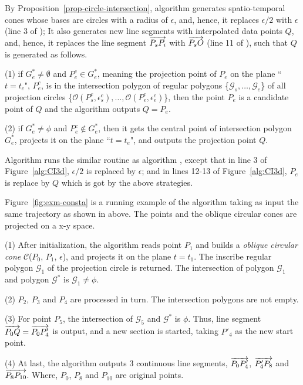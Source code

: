 By Proposition~\ref{prop-circle-intersection}, algorithm \cista generates spatio-temporal cones whose bases are circles with a radius of $\epsilon$,
and, hence, it replaces $\epsilon/2$ with $\epsilon$ (line 3 of \cist);
It also generates new line segments with interpolated data points $Q$, and, hence,  it replaces the line segment $\protect\overrightarrow{P_sP_i}$ with $\protect\overrightarrow{P_sO}$ (line 11 of \cist),
such that $Q$ is generated as follows.


\sstab (1) if $G^*_e \ne \emptyset$ and $P^c_e \in G^*_e$, meaning the projection point of $P_e$ on the plane ``$t=t_c$", \ie $P^c_e$, is in the intersection polygon of regular polygons \{$\mathcal{G}_s, \dots, \mathcal{G}_e$\} of all projection circles \{$\mathcal{O}(P^c_s, \epsilon^c_s), \ldots, \mathcal{O}(P^c_e, \epsilon^c_e)$\}, then the point $P_e$ is a candidate point of $Q$ and the algorithm outputs $Q=P_e$.

\sstab (2) if $G^*_e \ne \phi$ and $P^c_e \notin G^*_e$, then it gets the central point of intersection polygon $G^*_e$, projects it on the plane ``$t=t_e$", and outputs the projection point $Q$.

\vspace{1ex}
Algorithm \cista runs the similar routine as algorithm \cist, except that in line 3 of Figure~\ref{alg:CI3d}, $\epsilon/2$ is replaced by $\epsilon$; and in lines 12-13 of Figure~\ref{alg:CI3d}, $P_e$ is replace by $Q$ which is got by the above strategies.



\begin{example}
\label{exm-alg-conesta}
Figure~\ref{fig:exm-consta} is a running example of the \cista algorithm taking as input the same trajectory as shown in above.
The points and the oblique circular cones are projected on a x-y space.

\ni (1) After initialization, the \cista algorithm reads point $P_1$ and builds a \emph{oblique circular cone} $\mathcal{C}$($P_0$, $P_{1}$, $\epsilon$), and projects it on the plane $t=t_1$. The inscribe regular polygon $\mathcal{G}_1$ of the projection circle is returned. The intersection of polygon $\mathcal{G}_1$ and polygon $\mathcal{G}^*$ is $\mathcal{G}_1 \ne \phi$.

\ni (2) $P_2$, $P_3$ and $P_4$ are processed in turn. The intersection polygons are not empty.

\ni (3) For point $P_5$, the intersection of $\mathcal{G}_5$ and $\mathcal{G}^*$ is $\phi$. Thus, line segment $\protect\overrightarrow{P_0Q} =\protect\overrightarrow{P_0P'_4}$ is output, and a new section is started, taking $P'_4$ as the new start point.

\ni (4) At last, the algorithm outputs 3 continuous line segments, \ie $\protect\overrightarrow{P_0P'_4}$, $\protect\overrightarrow{P'_4P_8}$ and $\protect\overrightarrow{P_8P_{10}}$. Where, $P_0$, $P_8$ and $P_{10}$ are original points.
\end{example}





